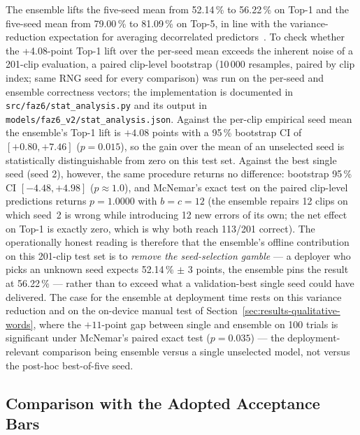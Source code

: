 The ensemble lifts the five-seed mean from 52.14\,\% to 56.22\,\% on
Top-1 and the five-seed mean from 79.00\,\% to 81.09\,\% on Top-5, in
line with the variance-reduction expectation for averaging
decorrelated predictors~\cite{dietterich2000ensemble}. To check
whether the +4.08-point Top-1 lift over the per-seed mean exceeds the
inherent noise of a 201-clip evaluation, a paired clip-level bootstrap
(10\,000 resamples, paired by clip index; same RNG seed for every
comparison) was run on the per-seed and ensemble correctness vectors;
the implementation is documented in
\texttt{src/faz6/stat\_analysis.py} and its output in
\texttt{models/faz6\_v2/stat\_analysis.json}. Against the per-clip
empirical seed mean the ensemble's Top-1 lift is
\(+4.08\) points with a 95\,\% bootstrap CI of \([+0.80, +7.46]\)
(\(p = 0.015\)), so the gain over the mean of an unselected seed is
statistically distinguishable from zero on this test set. Against the
best single seed (seed 2), however, the same procedure returns no
difference: bootstrap 95\,\% CI \([-4.48, +4.98]\) (\(p \approx 1.0\)),
and McNemar's exact test on the paired clip-level predictions returns
\(p = 1.0000\) with \(b = c = 12\) (the ensemble repairs 12 clips on
which seed~2 is wrong while introducing 12 new errors of its own; the
net effect on Top-1 is exactly zero, which is why both reach 113/201
correct). The operationally honest reading is therefore that the
ensemble's offline contribution on this 201-clip test set is to
\emph{remove the seed-selection gamble} --- a deployer who picks an
unknown seed expects 52.14\,\% \(\pm\) 3 points, the ensemble pins the
result at 56.22\,\% --- rather than to exceed what a validation-best
single seed could have delivered. The case for the ensemble at
deployment time rests on this variance reduction and on the on-device
manual test of Section~\ref{sec:results-qualitative-words}, where the
\(+11\)-point gap between single and ensemble on 100 trials is
significant under McNemar's paired exact test (\(p = 0.035\)) ---
the deployment-relevant comparison being ensemble versus a single
unselected model, not versus the post-hoc best-of-five seed.

\subsection{Comparison with the Adopted Acceptance Bars}
\label{sec:results-words-acceptance}

